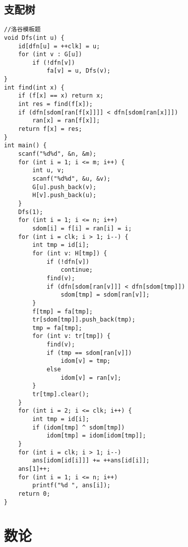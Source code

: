 \documentclass[twocolumn,a4]{article}
\begin{document}
\subsection{支配树}
\begin{lstlisting}
//洛谷模板题
void Dfs(int u) {
	id[dfn[u] = ++clk] = u;
	for (int v : G[u])
		if (!dfn[v])
			fa[v] = u, Dfs(v);
}
int find(int x) {
	if (f[x] == x) return x;
	int res = find(f[x]);
	if (dfn[sdom[ran[f[x]]]] < dfn[sdom[ran[x]]])
		ran[x] = ran[f[x]];
	return f[x] = res;
}
int main() {
	scanf("%d%d", &n, &m);
	for (int i = 1; i <= m; i++) {
		int u, v;
		scanf("%d%d", &u, &v);
		G[u].push_back(v);
		H[v].push_back(u);
	}
	Dfs(1);
	for (int i = 1; i <= n; i++)
		sdom[i] = f[i] = ran[i] = i;
	for (int i = clk; i > 1; i--) {
		int tmp = id[i];
		for (int v: H[tmp]) {
			if (!dfn[v])
				continue;
			find(v);
			if (dfn[sdom[ran[v]]] < dfn[sdom[tmp]])
				sdom[tmp] = sdom[ran[v]];
		}
		f[tmp] = fa[tmp];
		tr[sdom[tmp]].push_back(tmp);
		tmp = fa[tmp];
		for (int v: tr[tmp]) {
			find(v);
			if (tmp == sdom[ran[v]])
				idom[v] = tmp;
			else
				idom[v] = ran[v];
		}
		tr[tmp].clear();
	}
	for (int i = 2; i <= clk; i++) {
		int tmp = id[i];
		if (idom[tmp] ^ sdom[tmp])
			idom[tmp] = idom[idom[tmp]];
	}
	for (int i = clk; i > 1; i--)
		ans[idom[id[i]]] += ++ans[id[i]];
	ans[1]++;
	for (int i = 1; i <= n; i++)
		printf("%d ", ans[i]);
	return 0;
}
\end{lstlisting}

\section{数论}
\end{document}
